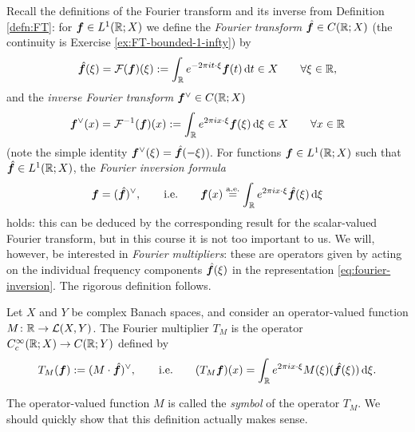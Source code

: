 Recall the definitions of the Fourier transform and its inverse from Definition \ref{defn:FT}: for $\bm{f} \in L^1(\mathbb{R};X)$ we define the \emph{Fourier transform} $\hat{\bm{f}} \in C(\mathbb{R};X)$ (the continuity is Exercise \ref{ex:FT-bounded-1-infty}) by 
  \begin{equation*}
    \hat{\bm{f}}(\xi) = \mathcal{F}(\bm{f})(\xi) := \int_{\mathbb{R}} e^{-2\pi i t \cdot \xi} \bm{f}(t)  \, \mathrm{d} t \in X \qquad \forall \xi \in \mathbb{R},
  \end{equation*}
  and the \emph{inverse Fourier transform} $\bm{f}^{\vee} \in C(\mathbb{R};X)$
  \begin{equation*}
    \bm{f}^{\vee}(x) = \mathcal{F}^{-1}(\bm{f})(x) := \int_{\mathbb{R}} e^{2\pi i x \cdot \xi} \bm{f}(\xi) \, \mathrm{d} \xi \in X \qquad \forall x \in \mathbb{R}
  \end{equation*}
  (note the simple identity $\bm{f}^{\vee}(\xi) = \hat{\bm{f}}(-\xi)$).
  For functions $\bm{f} \in L^1(\mathbb{R};X)$ such that $\hat{\bm{f}} \in L^1(\mathbb{R};X)$, the \emph{Fourier inversion formula}
  \begin{equation}\label{eq:fourier-inversion}
    \bm{f} = (\hat{\bm{f}})^\vee, \qquad \text{i.e.} \qquad \bm{f}(x) \stackrel{\mathrm{a.e.}}{=} \int_{\mathbb{R}} e^{2\pi i x \cdot \xi} \hat{\bm{f}}(\xi)  \, \mathrm{d}\xi
  \end{equation}
  holds: this can be deduced by the corresponding result for the scalar-valued Fourier transform, but in this course it is not too important to us.
  We will, however, be interested in \emph{Fourier multipliers}: these are operators given by acting on the individual frequency components $\hat{\bm{f}}(\xi)$ in the representation \eqref{eq:fourier-inversion}.
  The rigorous definition follows.

\begin{defn}
  Let $X$ and $Y$ be complex Banach spaces, and consider an operator-valued function $M \colon \mathbb{R} \rightarrow \mathcal{L}(X,Y)$.
  The Fourier multiplier $T_{M}$ is the operator $C^{\infty}_{c}(\mathbb{R};X) \to C(\mathbb{R};Y)$ defined by
  \begin{equation*}
    T_{M}(\bm{f}) := (M \cdot \hat{\bm{f}})^{\vee}, \qquad \text{i.e.} \qquad (T_{M}\bm{f})(x) = \int_{\mathbb{R}} e^{2\pi i x \cdot \xi} M(\xi)(\hat{\bm{f}}(\xi))  \, \mathrm{d}\xi.
  \end{equation*}
\end{defn}

The operator-valued function $M$ is called the \emph{symbol} of the operator $T_{M}$.
We should quickly show that this definition actually makes sense.

